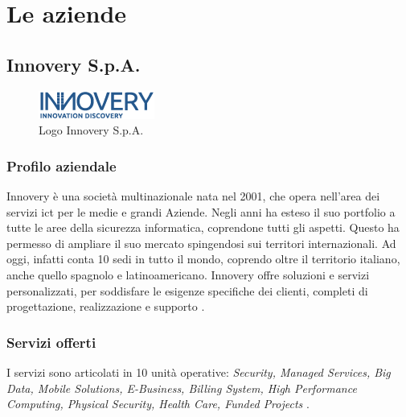 \chapter{Le aziende}
\label{chap:aziende}
\section{Innovery S.p.A.}
\label{sec:innovery}

\begin{figure}
\begin{center}
\includegraphics[width=0.5\columnwidth]{images/logo_innovery.png}
\end{center}
\caption{Logo Innovery S.p.A.}
\label{fig:logo_innovery}
\end{figure}

\subsection{Profilo aziendale}
\label{subsec:innoprofilo}


Innovery è una società multinazionale nata nel 2001, che opera nell’area dei servizi \Gls{ict} per le medie e grandi Aziende. Negli anni ha esteso il suo portfolio a tutte le aree della sicurezza informatica, coprendone tutti gli aspetti. Questo ha permesso di ampliare il suo mercato spingendosi sui territori internazionali. Ad oggi, infatti conta 10 sedi in tutto il mondo, coprendo oltre il territorio italiano, anche quello spagnolo e latinoamericano. Innovery offre soluzioni e servizi personalizzati, per soddisfare le esigenze specifiche dei clienti, completi di progettazione, realizzazione e supporto \cite{innovery}.


\subsection{Servizi offerti}
\label{subsec:innoservizi}
I servizi sono articolati in 10 unità operative: \textit{Security, Managed Services, Big Data, Mobile Solutions, E-Business, Billing  System, High  Performance  Computing, Physical  Security, Health Care, Funded  Projects} \cite{innoveryservizi}.\\


